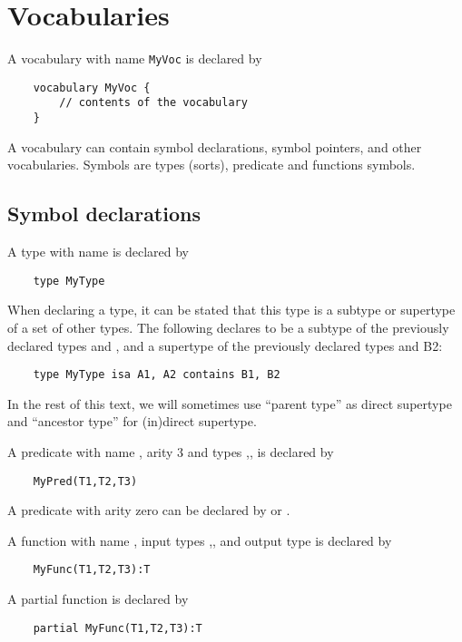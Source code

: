 \section{Vocabularies}
A vocabulary with name {\tt MyVoc} is declared by
\begin{lstlisting}
	vocabulary MyVoc {
		// contents of the vocabulary
	}
\end{lstlisting}
A vocabulary can contain symbol declarations, symbol pointers, and other vocabularies. Symbols are types (sorts), predicate and functions symbols.


\subsection{Symbol declarations}
\label{ssec:symbols}
A type with name  is declared by
\begin{lstlisting}
	type MyType
\end{lstlisting}
When declaring a type, it can be stated that this type is a subtype or supertype of a set of other types.  The following declares  to be a subtype of the previously declared types  and , and a supertype of the previously declared types  and {B2}:
\begin{lstlisting}
	type MyType isa A1, A2 contains B1, B2
\end{lstlisting}
In the rest of this text, we will sometimes use ``parent type'' as direct supertype and ``ancestor type'' for (in)direct supertype.

A predicate with name , arity 3 and types ,, is declared by
\begin{lstlisting}
	MyPred(T1,T2,T3)
\end{lstlisting}

A predicate with arity zero can be declared by  or .

A function with name , input types ,, and output type   is declared by
\begin{lstlisting}
	MyFunc(T1,T2,T3):T
\end{lstlisting}

A partial function is declared by 
\begin{lstlisting}
	partial MyFunc(T1,T2,T3):T
\end{lstlisting}

